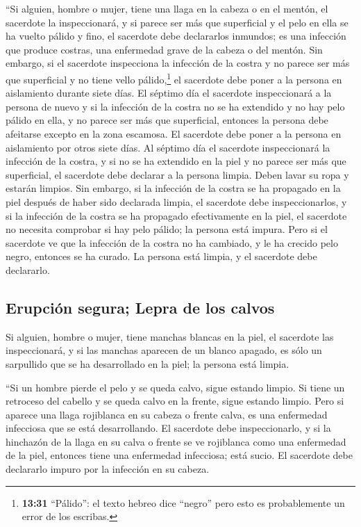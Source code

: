  ``Si alguien, hombre o mujer, tiene una llaga en la
cabeza o en el mentón,  el sacerdote la inspeccionará, y
si parece ser más que superficial y el pelo en ella se ha vuelto pálido
y fino, el sacerdote debe declararlos inmundos; es una infección que
produce costras, una enfermedad grave de la cabeza o del mentón.
 Sin embargo, si el sacerdote inspecciona la infección de
la costra y no parece ser más que superficial y no tiene vello
pálido,\footnote{\textbf{13:31} ``Pálido'': el texto hebreo dice
  ``negro'' pero esto es probablemente un error de los escribas.} el
sacerdote debe poner a la persona en aislamiento durante siete días.
 El séptimo día el sacerdote inspeccionará a la persona
de nuevo y si la infección de la costra no se ha extendido y no hay pelo
pálido en ella, y no parece ser más que superficial, 
entonces la persona debe afeitarse excepto en la zona escamosa. El
sacerdote debe poner a la persona en aislamiento por otros siete días.
 Al séptimo día el sacerdote inspeccionará la infección
de la costra, y si no se ha extendido en la piel y no parece ser más que
superficial, el sacerdote debe declarar a la persona limpia. Deben lavar
su ropa y estarán limpios.  Sin embargo, si la infección
de la costra se ha propagado en la piel después de haber sido declarada
limpia,  el sacerdote debe inspeccionarlos, y si la
infección de la costra se ha propagado efectivamente en la piel, el
sacerdote no necesita comprobar si hay pelo pálido; la persona está
impura.  Pero si el sacerdote ve que la infección de la
costra no ha cambiado, y le ha crecido pelo negro, entonces se ha
curado. La persona está limpia, y el sacerdote debe declararlo.

\hypertarget{erupciuxf3n-segura-lepra-de-los-calvos}{%
\subsection{Erupción segura; Lepra de los
calvos}\label{erupciuxf3n-segura-lepra-de-los-calvos}}

 Si alguien, hombre o mujer, tiene manchas blancas en la
piel,  el sacerdote las inspeccionará, y si las manchas
aparecen de un blanco apagado, es sólo un sarpullido que se ha
desarrollado en la piel; la persona está limpia.

 ``Si un hombre pierde el pelo y se queda calvo, sigue
estando limpio.  Si tiene un retroceso del cabello y se
queda calvo en la frente, sigue estando limpio.  Pero si
aparece una llaga rojiblanca en su cabeza o frente calva, es una
enfermedad infecciosa que se está desarrollando.  El
sacerdote debe inspeccionarlo, y si la hinchazón de la llaga en su calva
o frente se ve rojiblanca como una enfermedad de la piel,
 entonces tiene una enfermedad infecciosa; está sucio. El
sacerdote debe declararlo impuro por la infección en su cabeza.

